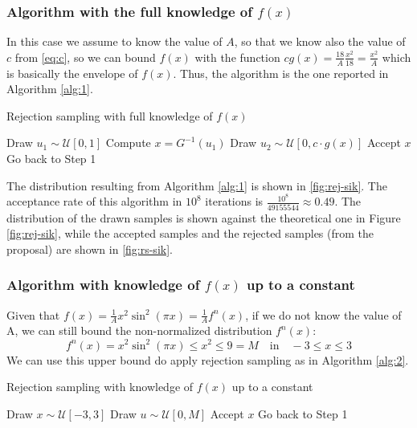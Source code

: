 \documentclass[a4paper,12pt]{article}
\begin{document}
\subsubsection*{Algorithm with the full knowledge of $f(x)$}
In this case we assume to know the value of $A$, so that we know also the value of $c$ from \ref{eq:c}, so we can bound $f(x)$ with the function $cg(x) = \frac{18}{A}\frac{x^2}{18} =\frac{x^2}{A}$ which is basically the envelope of $f(x)$.
Thus, the algorithm is the one reported in Algorithm \ref{alg:1}.

\begin{algorithm}
\caption{Rejection sampling with full knowledge of $f(x)$}
\label{alg:1}
\begin{algorithmic}[1]
\STATE Draw $u_1 \sim \mathcal{U}[0,1]$
\STATE Compute $x = G^{-1}(u_1)$
\STATE Draw $u_2 \sim \mathcal{U}[0, c \cdot g(x)]$
    \STATE Accept $x$
\ELSE
    \STATE Go back to Step 1
\ENDIF
\end{algorithmic}
\end{algorithm}

The distribution resulting from Algorithm \ref{alg:1} is shown in \ref{fig:rej-sik}. The acceptance rate of this algorithm in $10^8$ iterations is $\frac{10^8}{49155544} \approx 0.49$. The distribution of the drawn samples is shown against the theoretical one in Figure \ref{fig:rej-sik}, while the accepted samples and the rejected samples (from the proposal) are shown in \ref{fig:rs-sik}.

\subsubsection*{Algorithm with knowledge of $f(x)$ up to a constant}
Given that $f(x) = \frac{1}{A}x^2\sin^2(\pi x)=\frac{1}{A}f^n(x)$, if we do not know the value of A, we can still bound the non-normalized distribution $f^{n}(x)$:
\begin{equation}
    f^n(x) = x^2\sin^2(\pi x) \leq x^2 \leq 9 = M\quad \text{in}\quad -3\leq x\leq3 
\end{equation}
We can use this upper bound do apply rejection sampling as in Algorithm \ref{alg:2}.

\begin{algorithm}
\caption{Rejection sampling with knowledge of $f(x)$ up to a constant}
\label{alg:2}
\begin{algorithmic}[1]
\STATE Draw $x \sim \mathcal{U}[-3,3]$
\STATE Draw $u \sim \mathcal{U}[0, M]$
    \STATE Accept $x$
\ELSE
    \STATE Go back to Step 1
\ENDIF
\end{algorithmic}
\end{algorithm}
\end{document}
